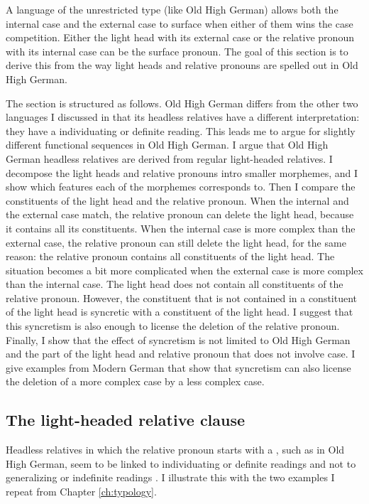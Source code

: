 A language of the unrestricted type (like Old High German) allows both the internal case and the external case to surface when either of them wins the case competition. Either the light head with its external case or the relative pronoun with its internal case can be the surface pronoun. The goal of this section is to derive this from the way light heads and relative pronouns are spelled out in Old High German.

The section is structured as follows.
Old High German differs from the other two languages I discussed in that its headless relatives have a different interpretation: they have a individuating or definite reading. This leads me to argue for slightly different functional sequences in Old High German.
I argue that Old High German headless relatives are derived from regular light-headed relatives.
I decompose the light heads and relative pronouns intro smaller morphemes, and I show which features each of the morphemes corresponds to.
Then I compare the constituents of the light head and the relative pronoun.
When the internal and the external case match, the relative pronoun can delete the light head, because it contains all its constituents.
When the internal case is more complex than the external case, the relative pronoun can still delete the light head, for the same reason: the relative pronoun contains all constituents of the light head.
The situation becomes a bit more complicated when the external case is more complex than the internal case. The light head does not contain all constituents of the relative pronoun. However, the constituent that is not contained in a constituent of the light head is syncretic with a constituent of the light head. I suggest that this syncretism is also enough to license the deletion of the relative pronoun.
Finally, I show that the effect of syncretism is not limited to Old High German and the part of the light head and relative pronoun that does not involve case. I give examples from Modern German that show that syncretism can also license the deletion of a more complex case by a less complex case.



\subsection{The light-headed relative clause}

Headless relatives in which the relative pronoun starts with a , such as in Old High German, seem to be linked to individuating or definite readings and not to generalizing or indefinite readings \citep[cf.][]{fuss2017}. I illustrate this with the two examples I repeat from Chapter  \ref{ch:typology}.

